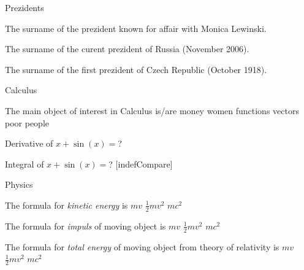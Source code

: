 \documentclass{article}
\begin{document}
\def\title{My Jeopardy}

\SetGameHeight{100pt}



\MakeGameBoard
\begin{category}{Prezidents}
  \begin{question}
    The surname of the prezident known for affair with Monica Lewinski.
  \end{question}
  \begin{question}
    The surname of the curent prezident of Russia (November 2006).
  \end{question}
  \begin{question}
    The surname of the first prezident of Czech Republic (October 1918).
  \end{question}
\end{category}
\begin{category}{Calculus}
  \begin{question}
    The main object of interest in Calculus is/are
     money
     women
     functions
     vectors
     poor people
  \end{question}
  \begin{question}
    Derivative of $x+\sin(x)=$?
  \end{question}
  \begin{question}
    Integral of $x+\sin(x)=$?
    [indefCompare]
  \end{question}
\end{category}
\begin{category}{Physics}
  \begin{question}
    The formula for \textit{kinetic energy} is
     $ mv$
     $\frac 12 mv^2$
     $mc^2$
  \end{question}
  \begin{question}
    The formula for \textit{impuls} of moving object is
     $ mv$
     $\frac 12 mv^2$
     $mc^2$
  \end{question}
  \begin{question}
    The formula for \textit{total energy} of moving object from theory
    of relativity is 
     $ mv$ 
     $\frac 12 mv^2$ 
     $mc^2$
  \end{question}
\end{category}
\end{document}
